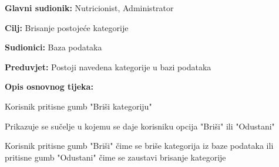                     \noindent {}
                    \begin{packed_item}
    
                        \item \textbf{Glavni sudionik: }Nutricionist, Administrator
                        \item  \textbf{Cilj:} Brisanje postojeće kategorije
                        \item  \textbf{Sudionici:} Baza podataka
                        \item  \textbf{Preduvjet:} Postoji navedena kategorije u bazi podataka
                        \item  \textbf{Opis osnovnog tijeka:} 
                        
                        \item[] \begin{packed_enum}
    
                            \item Korisnik pritisne gumb "Briši kategoriju"
                            \item Prikazuje se sučelje u kojemu se daje korisniku opcija "Briši" ili "Odustani"
                            \item Korisnik pritisne gumb "Briši" čime se briše kategorija iz baze podataka ili pritisne gumb "Odustani" čime se zaustavi brisanje kategorije
                        \end{packed_enum}
                        
                    \end{packed_item}



